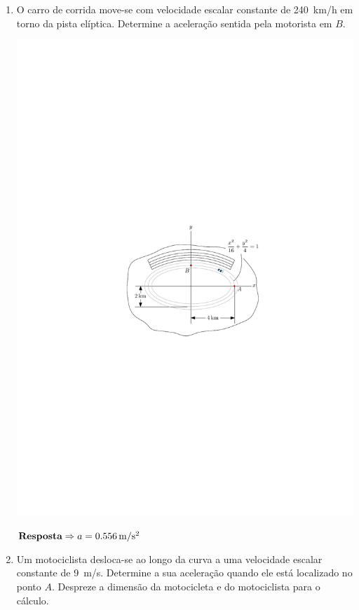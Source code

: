 \documentclass[a4paper,12pt]{article}
\begin{document}
\begin{enumerate}
		\newpage
		
		
		\item O carro de corrida move-se com velocidade escalar constante de \SI{240}{\kilo\meter/\hour} em torno da pista elíptica. Determine a aceleração sentida pela motorista em $B$.
		
		\vspace{-.5cm}
		\begin{flushright}
			\includegraphics[scale=1.2]{images/draw_4}
		\end{flushright}
		
		\vspace{-8.5cm}
		$\textbf{\text{Resposta}}\Rightarrow a=\SI{0.556}{\meter/\second^{2}}$
		\vspace{7.5cm}
		
		\item Um motociclista desloca-se ao longo da curva a uma velocidade escalar constante de \SI{9}{\meter/\second}. Determine a sua aceleração quando ele está localizado no ponto $A$. Despreze a dimensão da motocicleta e do motociclista para o cálculo.
		

\end{enumerate}
\end{document}
